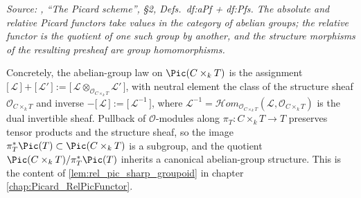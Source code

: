 \textit{Source: \cite{kleiman-picard}, ``The Picard scheme'', \S 2, Defs.~df:aPf + df:Pfs.
The absolute and relative Picard functors take values in the category of
abelian groups; the relative functor is the quotient of one such group by
another, and the structure morphisms of the resulting presheaf are group
homomorphisms.}

Concretely, the abelian-group law on \(\Pic(C \times_k T)\) is the assignment
\(\bigl[\,\mathcal{L}\,\bigr] + \bigl[\,\mathcal{L}'\,\bigr] :=
\bigl[\,\mathcal{L} \otimes_{\mathcal{O}_{C \times_k T}} \mathcal{L}'\,\bigr]\),
with neutral element the class of the structure sheaf
\(\mathcal{O}_{C \times_k T}\) and inverse
\(- \bigl[\,\mathcal{L}\,\bigr] := \bigl[\,\mathcal{L}^{-1}\,\bigr]\), where
\(\mathcal{L}^{-1} = \mathcal{H}om_{\mathcal{O}_{C \times_k T}}(\mathcal{L},
\mathcal{O}_{C \times_k T})\) is the dual invertible sheaf. Pullback of
\(\mathcal{O}\)-modules along \(\pi_T : C \times_k T \to T\) preserves tensor
products and the structure sheaf, so the image
\(\pi_T^* \Pic(T) \subset \Pic(C \times_k T)\) is a subgroup, and the quotient
\(\Pic(C \times_k T) / \pi_T^* \Pic(T)\) inherits a canonical abelian-group
structure. This is the content of
\cref{lem:rel_pic_sharp_groupoid} in chapter \cref{chap:Picard_RelPicFunctor}.

